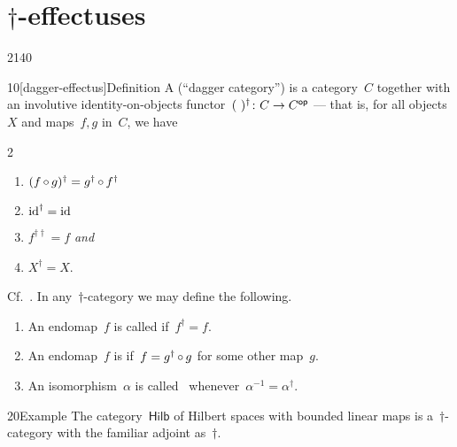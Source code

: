 \section{\texorpdfstring{$\dagger$-effectuses}{%
                    dagger-effectuses}}
\begin{parsec}{2140}%
\begin{point}{10}[dagger-effectus]{Definition}%
A  (``dagger category'')
is a category~$C$ together with an involutive identity-on-objects
    functor~$(\ )^\dagger \colon C \to {C}{^{\mathsf{op}}}$
    ---
    that is, for all objects~$X$ and maps~$f,g$ in~$C$, we have
\begin{multicols}{2}
\begin{enumerate}
    \item $(f \mathop{\circ} g)^\dagger = g^\dagger \mathop{\circ} f^\dagger$
    \item $\mathrm{id}^\dagger = \mathrm{id}$
    \item $f^{\dagger\dagger} = f$ \emph{and}
    \item $X^\dagger = X$.
\end{enumerate}
\end{multicols}
\noindent
Cf.~\cite{burgin1970categories,selinger,heunenphd,karvonen}.
In any~$\dagger$-category we may define the following.
\begin{enumerate}
\item
    An endomap~$f$ is called 
    if~$f^\dagger = f$.
\item
    An endomap~$f$ is 
    if~$f = g^\dagger \mathop{\circ} g$ for some other map~$g$.
\item
    An isomorphism~$\alpha$ is called~
        whenever~$\alpha^{-1} = \alpha^\dagger$.
\end{enumerate}
\end{point}
\spacingfix{}
\begin{point}{20}{Example}%
The category~$\mathsf{Hilb}$
    of Hilbert spaces with bounded linear maps
    is a~$\dagger$-category
    with the familiar adjoint as~$\dagger$.
\end{point}
\end{parsec}
